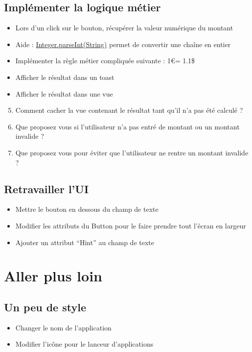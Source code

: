 \documentclass{article}
\begin{document}
\subsection{Implémenter la logique métier}
\begin{itemize}
\item Lors d'un click sur le bouton, récupérer la valeur numérique du montant
\item Aide : \href{http://developer.android.com/reference/java/lang/Integer.html#parseInt(java.lang.String)}{Integer.parseInt(String)} permet de convertir une chaîne en entier
\item Implémenter la règle métier compliquée suivante : 1\euro  = 1.1\$
\item Afficher le résultat dans un toast
\item Afficher le résultat dans une vue
\end{itemize}
\begin{enumerate}
 \setcounter{enumi}{4}
\item Comment cacher la vue contenant le résultat tant qu'il n'a pas été
calculé ?
\item Que proposez vous si l'utilisateur n'a pas entré de montant ou un montant
invalide ?
\item Que proposez vous pour éviter que l'utilisateur ne rentre un montant
invalide ?
\end{enumerate}
\subsection{Retravailler l'UI}
\begin{itemize}
\item Mettre le bouton en dessous du champ de texte
\item Modifier les attributs du Button pour le faire prendre tout l'écran en largeur
\item Ajouter un attribut ``Hint'' au champ de texte
\end{itemize}
\newpage
\section{Aller plus loin}
\subsection{Un peu de style}
\begin{itemize}
\item Changer le nom de l'application
\item Modifier l'icône pour le lanceur d'applications
\end{itemize}
\end{document}

